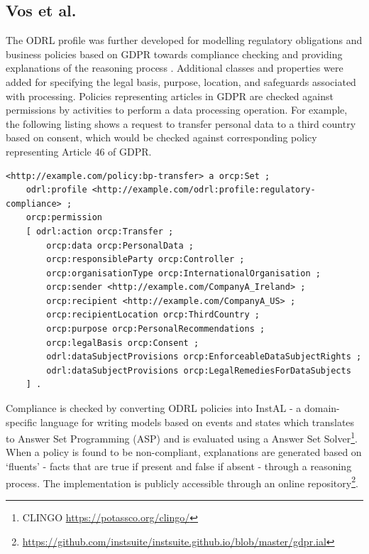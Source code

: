 \subsection*{Vos et al.}
The ODRL profile was further developed for modelling regulatory obligations and business policies based on GDPR towards compliance checking and providing explanations of the reasoning process \cite{vos_odrl_2019}. Additional classes and properties were added for specifying the legal basis, purpose, location, and safeguards associated with processing. Policies representing articles in GDPR are checked against permissions by activities to perform a data processing operation. For example, the following listing shows a request to transfer personal data to a third country based on consent, which would be checked against corresponding policy representing Article 46 of GDPR. 
\begin{listing}[htbp]
\begin{verbatim}
<http://example.com/policy:bp-transfer> a orcp:Set ;
    odrl:profile <http://example.com/odrl:profile:regulatory-compliance> ;
    orcp:permission
    [ odrl:action orcp:Transfer ;
        orcp:data orcp:PersonalData ;
        orcp:responsibleParty orcp:Controller ;
        orcp:organisationType orcp:InternationalOrganisation ;
        orcp:sender <http://example.com/CompanyA_Ireland> ;
        orcp:recipient <http://example.com/CompanyA_US> ;
        orcp:recipientLocation orcp:ThirdCountry ;
        orcp:purpose orcp:PersonalRecommendations ;
        orcp:legalBasis orcp:Consent ;
        odrl:dataSubjectProvisions orcp:EnforceableDataSubjectRights ;
        odrl:dataSubjectProvisions orcp:LegalRemediesForDataSubjects
    ] .
\end{verbatim}
\end{listing}
Compliance is checked by converting ODRL policies into InstAL - a domain-specific language for writing models based on events and states which translates to Answer Set Programming (ASP) and is evaluated using a Answer Set Solver\footnote{CLINGO \url{https://potassco.org/clingo/}}. When a policy is found to be non-compliant, explanations are generated based on `fluents' - facts that are true if present and false if absent - through a reasoning process. The implementation is publicly accessible through an online repository\footnote{\url{https://github.com/instsuite/instsuite.github.io/blob/master/gdpr.ial}}. 

